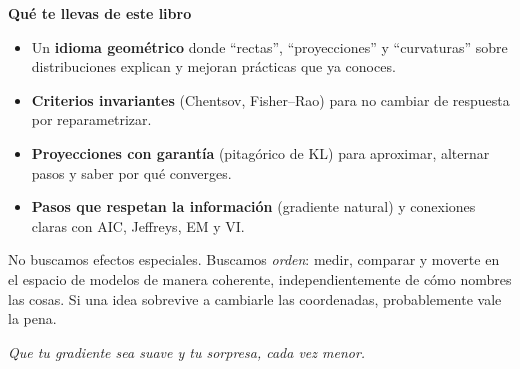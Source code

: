 \textbf{Qué te llevas de este libro}

\begin{itemize}
	\item Un \textbf{idioma geométrico} donde “rectas”, “proyecciones” y “curvaturas” sobre distribuciones explican y mejoran prácticas que ya conoces.
	\item \textbf{Criterios invariantes} (Chentsov, Fisher--Rao) para no cambiar de respuesta por reparametrizar.
	\item \textbf{Proyecciones con garantía} (pitagórico de KL) para aproximar, alternar pasos y saber por qué converges.
	\item \textbf{Pasos que respetan la información} (gradiente natural) y conexiones claras con AIC, Jeffreys, EM y VI.
\end{itemize}

No buscamos efectos especiales. Buscamos \emph{orden}: medir, comparar y moverte en el espacio de modelos de manera coherente, independientemente de cómo nombres las cosas. Si una idea sobrevive a cambiarle las coordenadas, probablemente vale la pena.

\begin{flushright}
	\emph{Que tu gradiente sea suave y tu sorpresa, cada vez menor.}
\end{flushright}

\endgroup
